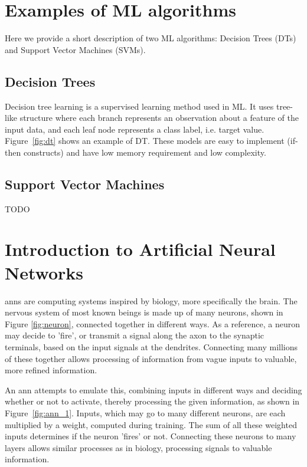 \documentclass[parskip=half,notes,cadrem,toolver]{iisvlsi}
\begin{document}
\ifx
\section{Examples of ML algorithms}
Here we provide a short description of two ML algorithms: Decision Trees (DTs) and Support Vector Machines (SVMs).

\subsection{Decision Trees}
Decision tree learning is a supervised learning method used in ML. It uses tree-like structure where each branch represents an observation about a feature of the input data, and each leaf node represents a class label, i.e. target value. Figure~\ref{fig:dt} shows an example of DT. These models are easy to implement (if-then constructs) and have low memory requirement and low complexity.

\subsection{Support Vector Machines}
TODO
\fi

\section{Introduction to Artificial Neural Networks}

\glspl{ann} are computing systems inspired by biology, more specifically the brain. The nervous system of most known beings is made up of many neurons, shown in Figure \ref{fig:neuron}, connected together in different ways. As a reference, a neuron may decide to 'fire', or transmit a signal along the axon to the synaptic terminals, based on the input signals at the dendrites. Connecting many millions of these together allows processing of information from vague inputs to valuable, more refined information.

An \gls{ann} attempts to emulate this, combining inputs in different ways and deciding whether or not to activate, thereby processing the given information, as shown in Figure~\ref{fig:ann_1}. Inputs, which may go to many different neurons, are each multiplied by a weight, computed during training. The sum of all these weighted inputs determines if the neuron 'fires' or not. Connecting these neurons to many layers allows similar processes as in biology, processing signals to valuable information.
\end{document}
